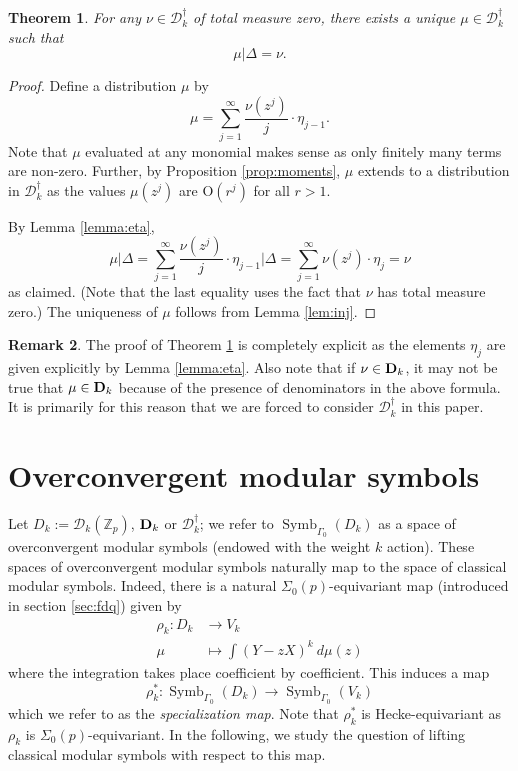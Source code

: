 \documentclass{amsart}
\theoremstyle{plain}
\newtheorem{thm}{Theorem}[section]
\theoremstyle{definition}
\newtheorem{remark}[thm]{Remark}
\newcommand{\D}{{\mathcal D}}
\newcommand{\bD}{{\bf D}}
\newcommand{\OO}{\text{O}}
\newcommand{\Z}{{\mathbb Z}}
\newcommand{\Zp}{\Z_p}
\newcommand{\maps}{\rightarrow}
\newcommand{\sigop}{\Sigma_0(p)}
\renewcommand{\sp}{{\rho^*_k}}
\newcommand{\Dvrig}[1]{\bD_{#1}}
\newcommand{\Dkrig}{\Dvrig{k}}
\newcommand{\Dkoc}{\D_k^\dag}
\newcommand{\Dvla}[1]{\D_{#1}(\Zp)}
\newcommand{\Dkla}{\Dvla{k}}
\DeclareMathOperator{\Symb}{Symb}
\newcommand{\MSo}[1]{\Symb_{\Gamma_0}(#1)}
\begin{document}
\begin{thm}
\label{thm:diffeqn}
For any $\nu \in \Dkoc$ of total measure zero, there exists a
unique $\mu \in \Dkoc$ such that
$$
\mu\big| \Delta = \nu.
$$
\end{thm}

\begin{proof}
Define a distribution $\mu$ by
$$
\mu = \sum_{j=1}^\infty \frac{\nu(z^j)}{j} \cdot \eta_{j-1}.
$$
Note that $\mu$ evaluated at any monomial makes sense as only finitely many terms are non-zero.  Further, by Proposition \ref{prop:moments}, $\mu$ extends to a distribution in $\Dkoc$ as the values $\mu(z^j)$ are $\OO(r^j)$ for all $r>1$.

By Lemma \ref{lemma:eta}, 
$$
\mu \big| \Delta 
= \sum_{j=1}^\infty \frac{\nu(z^j)}{j} \cdot \eta_{j-1} \big| \Delta
= \sum_{j=1}^\infty \nu(z^j) \cdot \eta_{j} = \nu
$$
as claimed.  (Note that the last equality uses the fact that $\nu$ has total measure zero.)  The uniqueness of $\mu$ follows from Lemma \ref{lem:inj}.
\end{proof}

\begin{remark}
The proof of Theorem \ref{thm:diffeqn} is completely explicit as the elements $\eta_j$ are given explicitly by Lemma \ref{lemma:eta}.  Also note that if $\nu \in \Dkrig$, it may not be true that $\mu \in \Dkrig$ because of the presence of denominators in the above formula.  It is primarily for this reason that we are forced to consider $\Dkoc$ in this paper.
\end{remark}


\section{Overconvergent modular symbols}
\label{sec:OMS}

Let $D_k := \Dkla$, $\Dkrig$ or $\Dkoc$; we refer to
$\MSo{D_k}$ as a space of overconvergent modular symbols
(endowed with the weight $k$ action).   These spaces of overconvergent modular symbols naturally map to the space of classical modular symbols.  Indeed, there is a natural $\sigop$-equivariant map (introduced in section \ref{sec:fdq}) given by
\begin{align*}
\rho_k :D_k &\maps V_k  \\
\mu &\mapsto \int (Y-zX)^k ~d\mu(z)
\end{align*}
where the integration takes place coefficient by coefficient. This
induces a map
$$
\sp : \MSo{D_k} \maps \MSo{V_k}
$$
which we refer to as the {\it specialization map}.  Note that $\sp$ is Hecke-equivariant as $\rho_k$ is $\sigop$-equivariant.  In the following, we study the question of lifting classical modular symbols with respect to this map.
\end{document}
